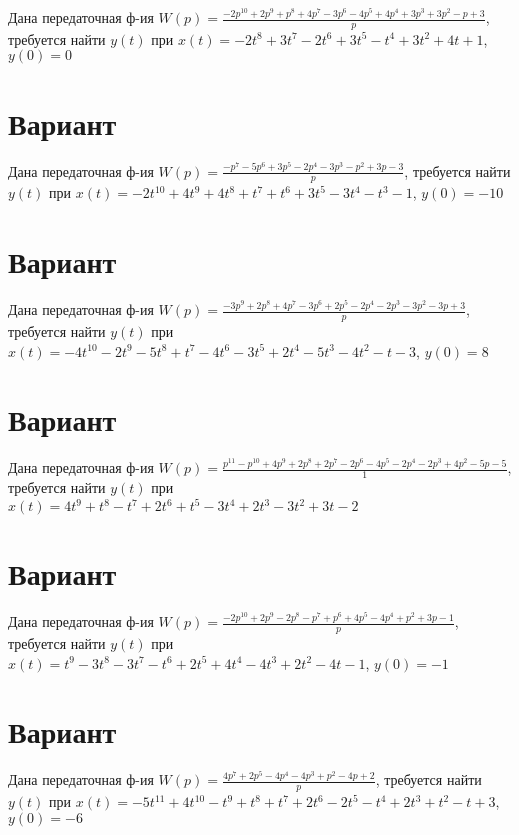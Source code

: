 \documentclass{article}
\begin{document}
Дана передаточная ф-ия $W(p)=\frac{-2p^{10}+2p^{9}+p^{8}+4p^{7}-3p^{6}-4p^{5}+4p^{4}+3p^{3}+3p^{2}-p+3}{p}$, требуется найти $y(t)$ при $x(t)=-2t^{8}+3t^{7}-2t^{6}+3t^{5}-t^{4}+3t^{2}+4t+1$, $y(0)=0$



\section{Вариант}

Дана передаточная ф-ия $W(p)=\frac{-p^{7}-5p^{6}+3p^{5}-2p^{4}-3p^{3}-p^{2}+3p-3}{p}$, требуется найти $y(t)$ при $x(t)=-2t^{10}+4t^{9}+4t^{8}+t^{7}+t^{6}+3t^{5}-3t^{4}-t^{3}-1$, $y(0)=-10$



\section{Вариант}

Дана передаточная ф-ия $W(p)=\frac{-3p^{9}+2p^{8}+4p^{7}-3p^{6}+2p^{5}-2p^{4}-2p^{3}-3p^{2}-3p+3}{p}$, требуется найти $y(t)$ при $x(t)=-4t^{10}-2t^{9}-5t^{8}+t^{7}-4t^{6}-3t^{5}+2t^{4}-5t^{3}-4t^{2}-t-3$, $y(0)=8$



\section{Вариант}

Дана передаточная ф-ия $W(p)=\frac{p^{11}-p^{10}+4p^{9}+2p^{8}+2p^{7}-2p^{6}-4p^{5}-2p^{4}-2p^{3}+4p^{2}-5p-5}{1}$, требуется найти $y(t)$ при $x(t)=4t^{9}+t^{8}-t^{7}+2t^{6}+t^{5}-3t^{4}+2t^{3}-3t^{2}+3t-2$



\section{Вариант}

Дана передаточная ф-ия $W(p)=\frac{-2p^{10}+2p^{9}-2p^{8}-p^{7}+p^{6}+4p^{5}-4p^{4}+p^{2}+3p-1}{p}$, требуется найти $y(t)$ при $x(t)=t^{9}-3t^{8}-3t^{7}-t^{6}+2t^{5}+4t^{4}-4t^{3}+2t^{2}-4t-1$, $y(0)=-1$



\section{Вариант}

Дана передаточная ф-ия $W(p)=\frac{4p^{7}+2p^{5}-4p^{4}-4p^{3}+p^{2}-4p+2}{p}$, требуется найти $y(t)$ при $x(t)=-5t^{11}+4t^{10}-t^{9}+t^{8}+t^{7}+2t^{6}-2t^{5}-t^{4}+2t^{3}+t^{2}-t+3$, $y(0)=-6$
\end{document}
